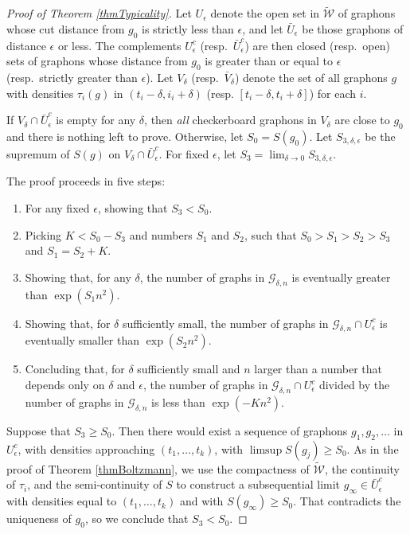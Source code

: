 \documentclass[12pt]{amsart}
\newcommand{\tdens}{\tau}
\newcommand{\1}{\mathbf{1}}
\newcommand{\www}{{\mathcal W}}
\begin{document}
\begin{proof}[Proof of Theorem \ref{thmTypicality}]
Let $U_\epsilon$ denote the open set in 
$\widetilde \www$ of graphons whose cut distance 
from $g_0$ is strictly less than $\epsilon$, and let $\bar U_\epsilon$ be those
graphons of distance $\epsilon$ or less. The complements $U_\epsilon^c$ 
(resp.~$\bar U_\epsilon^c$) are then closed (resp.~open) sets of graphons whose 
distance from $g_0$
is greater than or equal to $\epsilon$ (resp.~strictly greater than $\epsilon$). 
Let $V_\delta$ (resp.~$\bar V_\delta$) denote the set of all graphons $g$ with densities $\tdens_i(g)$
in $(t_i-\delta, i_i+\delta)$ (resp. $[t_i-\delta, t_i+\delta]$) for each $i$.

If $V_\delta \cap \bar U_\epsilon^c$ is empty for any $\delta$, then {\em all\/} 
checkerboard graphons in $V_\delta$ are close to $g_0$ and there is nothing left to prove. 
Otherwise, let $S_0 = S(g_0)$. Let
$S_{3,\delta,\epsilon}$
be the supremum of $S(g)$ on $V_\delta \cap \bar U_\epsilon^c$.
For fixed $\epsilon$, let $S_3 = \lim_{\delta \to 0} S_{3,\delta,\epsilon}$.

The proof proceeds in five steps:
\begin{enumerate}
\item For any fixed $\epsilon$, showing that
$S_3  < S_0$.
\item Picking $K < S_0 -S_3$ and numbers
$S_1$ and $S_2$, such that $S_0 > S_1 > S_2 > S_3$ and $S_1 = S_2 + K$.
\item Showing that, for any $\delta$, the number of graphs in
$\mathcal{G}_{\delta,n}$
is eventually greater than $\exp(S_1 n^2)$.
\item Showing that, for $\delta$ sufficiently small, the number of graphs in
$\mathcal{G}_{\delta,n} \cap U_\epsilon^c$ is eventually smaller than
$\exp(S_2 n^2)$.
\item Concluding that, for $\delta$ sufficiently small and $n$ larger than
a number
that depends only on $\delta$ and $\epsilon$, the number of graphs in
$\mathcal{G}_{\delta,n} \cap U_\epsilon^c$ divided by the number of
graphs in
$\mathcal{G}_{\delta,n}$ is less than $\exp(-Kn^2)$.
\end{enumerate}

\medskip

 Suppose that $S_3 \ge S_0$. Then there would
exist a sequence
of graphons $g_1, g_2, \ldots$ in $U_\epsilon^c$, with densities
approaching $(t_1,\ldots,t_k)$, with $\limsup S(g_j)\ge S_0$.
As in the proof of Theorem \ref{thmBoltzmann}, we use the compactness of 
$\widetilde \www$, the continuity of $\tdens_i$, and the semi-continuity 
of $S$ to construct
a subsequential limit $g_\infty \in \bar U_\epsilon^c$ with 
densities equal to $(t_1,\ldots,t_k)$ and
with $S(g_\infty) \ge S_0$. That contradicts the uniqueness of $g_0$, so we 
conclude that $S_3 < S_0$.


\end{proof}
\end{document}
